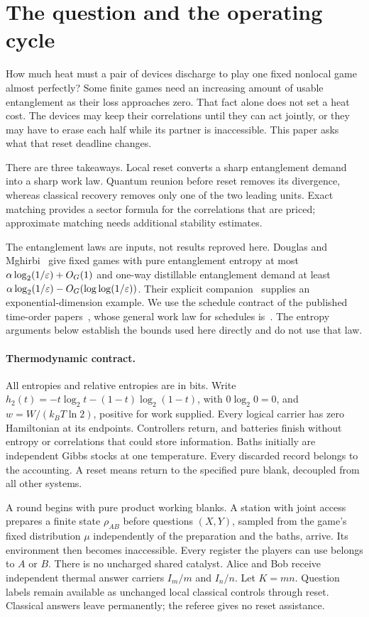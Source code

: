 \section{The question and the operating cycle}\label{sec:model}
How much heat must a pair of devices discharge to play one fixed nonlocal game almost perfectly? Some finite games need an increasing amount of usable entanglement as their loss approaches zero. That fact alone does not set a heat cost. The devices may keep their correlations until they can act jointly, or they may have to erase each half while its partner is inaccessible. This paper asks what that reset deadline changes.

There are three takeaways. Local reset converts a sharp entanglement demand into a sharp work law. Quantum reunion before reset removes its divergence, whereas classical recovery removes only one of the two leading units. Exact matching provides a sector formula for the correlations that are priced; approximate matching needs additional stability estimates.

The entanglement laws are inputs, not results reproved here. Douglas and Mghirbi~\cite[Theorem 11.9 and Corollary 11.11]{precision} give fixed games with pure entanglement entropy at most $\alpha\log_2(1/\varepsilon)+O_G(1)$ and one-way distillable entanglement demand at least $\alpha\log_2(1/\varepsilon)-O_G(\log\log(1/\varepsilon))$. Their explicit companion~\cite{explicit} supplies an exponential-dimension example. We use the schedule contract of the published time-order papers~\cite{order,waiting,realtime,clock}, whose general work law for schedules is~\cite[Theorem 1 and Appendix B, Theorem 7]{order}. The entropy arguments below establish the bounds used here directly and do not use that law.

\paragraph{Thermodynamic contract.}
All entropies and relative entropies are in bits. Write $h_2(t)=-t\log_2t-(1-t)\log_2(1-t)$, with $0\log_2 0=0$, and $w=W/(k_BT\ln2)$, positive for work supplied. Every logical carrier has zero Hamiltonian at its endpoints. Controllers return, and batteries finish without entropy or correlations that could store information. Baths initially are independent Gibbs stocks at one temperature. Every discarded record belongs to the accounting. A reset means return to the specified pure blank, decoupled from all other systems.

A round begins with pure product working blanks. A station with joint access prepares a finite state $\rho_{AB}$ before questions $(X,Y)$, sampled from the game's fixed distribution $\mu$ independently of the preparation and the baths, arrive. Its environment then becomes inaccessible. Every register the players can use belongs to $A$ or $B$. There is no uncharged shared catalyst. Alice and Bob receive independent thermal answer carriers $I_m/m$ and $I_n/n$. Let $K=mn$. Question labels remain available as unchanged local classical controls through reset. Classical answers leave permanently; the referee gives no reset assistance.


